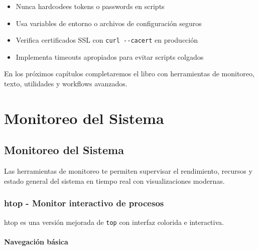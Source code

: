 \documentclass[
  11pt,
  letterpaper,
  oneside,
  openany]{scrbook}
\providecommand{\tightlist}{%
  \setlength{\itemsep}{0pt}\setlength{\parskip}{0pt}}
\begin{document}
\begin{tcolorbox}[enhanced jigsaw, toprule=.15mm, bottomrule=.15mm, opacityback=0, coltitle=black, rightrule=.15mm, colframe=quarto-callout-important-color-frame, titlerule=0mm, opacitybacktitle=0.6, left=2mm, colback=white, bottomtitle=1mm, arc=.35mm, leftrule=.75mm, title=\textcolor{quarto-callout-important-color}{\faExclamation}\hspace{0.5em}{Seguridad en red}, colbacktitle=quarto-callout-important-color!10!white, breakable, toptitle=1mm]

\begin{itemize}
\tightlist
\item
  Nunca hardcodees tokens o passwords en scripts
\item
  Usa variables de entorno o archivos de configuración seguros
\item
  Verifica certificados SSL con \texttt{curl\ -\/-cacert} en producción
\item
  Implementa timeouts apropiados para evitar scripts colgados
\end{itemize}

\end{tcolorbox}

En los próximos capítulos completaremos el libro con herramientas de
monitoreo, texto, utilidades y workflows avanzados.

\part{Monitoreo del Sistema}

\chapter{Monitoreo del Sistema}\label{monitoreo-del-sistema-2}

Las herramientas de monitoreo te permiten supervisar el rendimiento,
recursos y estado general del sistema en tiempo real con visualizaciones
modernas.

\section{htop - Monitor interactivo de procesos}\label{sec-htop}

htop es una versión mejorada de \texttt{top} con interfaz colorida e
interactiva.

\subsection{Navegación básica}\label{navegaciuxf3n-buxe1sica-1}
\end{document}
